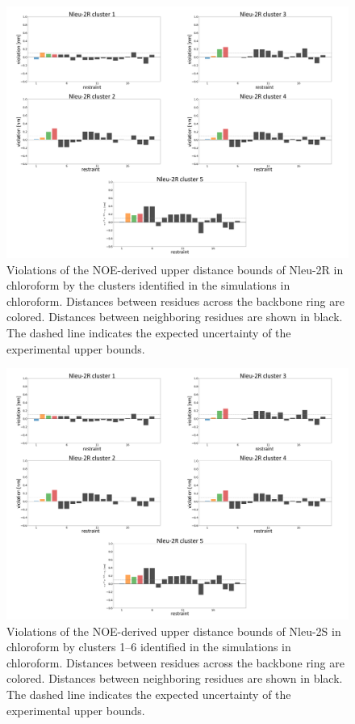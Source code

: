 \begin{figure}[h!]
    \centering
    \includegraphics[width=\textwidth]{7_chapter_5/fig/results/NMR_2R.png}
    \caption{Violations of the NOE-derived upper distance bounds of Nleu-2R in chloroform by the clusters identified in the simulations in chloroform. Distances between residues across the backbone ring are colored. Distances between neighboring residues are shown in black. The dashed line indicates the expected uncertainty of the experimental upper bounds.}
    \label{fig: SINOE violations Nleu-2R}
\end{figure}

\begin{figure}[h!]
    \centering
    \includegraphics[width=\textwidth]{7_chapter_5/fig/results/NMR_2R.png}
    \caption{Violations of the NOE-derived upper distance bounds of Nleu-2S in chloroform by clusters 1–6 identified in the simulations in chloroform. Distances between residues across the backbone ring are colored. Distances between neighboring residues are shown in black. The dashed line indicates the expected uncertainty of the experimental upper bounds.}
    \label{fig: SINOE violations Nleu-2S}
\end{figure}

